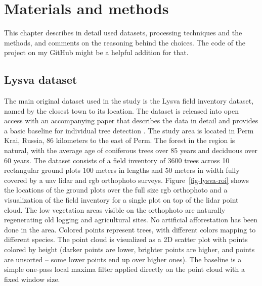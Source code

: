 \chapter{Materials and methods}\label{cap:materials}

This chapter describes in detail used datasets, processing techniques and the methods, and comments on the reasoning behind the choices.
The code of the project on my GitHub might be a helpful addition for that.


\section{Lysva dataset}\label{sec-lysva-dataset}

The main original dataset used in the study is the Lysva field inventory dataset, named by the closest town to its location.
The dataset is released into open access with an accompanying paper that describes the data in detail and provides a basic baseline for individual tree detection \citep{dubrovinExplorationPropertiesPoint2024}.
The study area is located in Perm Krai, Russia, 86 kilometers to the east of Perm.
The forest in the region is natural, with the average age of coniferous trees over 85 years and deciduous over 60 years.
The dataset consists of a field inventory of 3600 trees across 10 rectangular ground plots 100 meters in lengths and 50 meters in width fully covered by a \gls{uav} \gls{lidar} and \gls{rgb} orthophoto surveys.
Figure~\ref{fig-lysva-roi} shows the locations of the ground plots over the full size \gls{rgb} orthophoto and a visualization of the field inventory for a single plot on top of the \gls{lidar} point cloud.
The low vegetation areas visible on the orthophoto are naturally regenerating old logging and agricultural sites.
No artificial afforestation has been done in the area.
Colored points represent trees, with different colors mapping to different species.
The point cloud is visualized as a 2D scatter plot with points colored by height (darker points are lower, brighter points are higher, and points are unsorted – some lower points end up over higher ones).
The baseline is a simple one-pass local maxima filter applied directly on the point cloud with a fixed window size.

